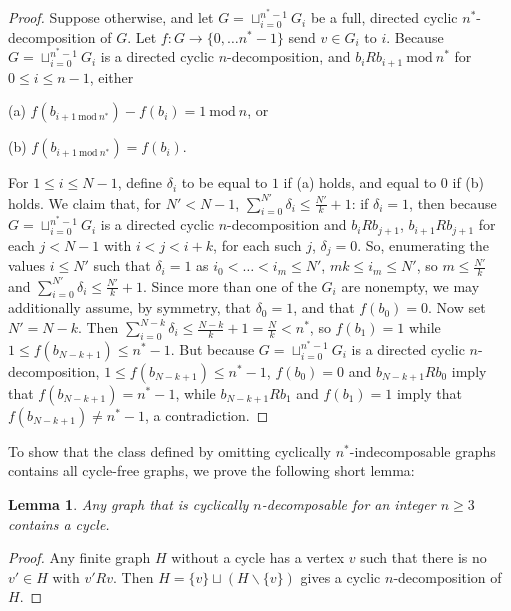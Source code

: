 \documentclass{amsart}
\newtheorem{lemma}[theorem]{Lemma}
\theoremstyle{definition}
\theoremstyle{remark}
\numberwithin{equation}{section}
\begin{document}
\begin{proof}
 Suppose otherwise, and let $G = \sqcup^{n^{*}-1}_{i = 0} G_{i}$ be a full, directed cyclic $n^{*}$-decomposition of $G$. Let $f: G \to \{0, \ldots n^{*}-1\}$ send $v \in G_{i}$ to $i$. Because $G = \sqcup^{n^{*}-1}_{i = 0} G_{i}$ is a directed cyclic $n$-decomposition, and $b_{i} R b_{i+1} \mathrm{\:mod\:} n^{*}$ for $0 \leq i \leq n-1$, either
 
 
 (a) $f(b_{i+1 \mathrm{\: mod \:} n^{*}})-f(b_{i})= 1 \mathrm{\: mod \:} n$, or

 (b) $f(b_{i+1 \mathrm{\: mod \:} n^{*}}) = f(b_{i})$.

For $1 \leq i \leq N-1$, define $\delta_{i}$ to be equal to $1$ if (a) holds, and equal to $0$ if (b) holds. We claim that, for $N' < N-1$, $\sum^{N'}_{i=0} \delta_{i} \leq \frac{N'}{k} +1$: if $\delta_{i} = 1$, then because $G = \sqcup^{n^{*}-1}_{i = 0} G_{i}$ is a directed cyclic $n$-decomposition and $b_{i}Rb_{j+1}$, $b_{i+1} R b_{j+1}$ for each $j < N-1$ with $i < j < i+k$, for each such $j$, $\delta_{j} = 0$. So, enumerating the values $i \leq N'$ such that $\delta_{i} = 1$ as $i_{0} < \ldots < i_{m} \leq N'$, $ mk \leq i_{m} \leq N'$, so $m \leq \frac{N'}{k}$ and $\sum^{N'}_{i=0} \delta_{i} \leq \frac{N'}{k} +1$. Since more than one of the $G_{i}$ are nonempty, we may additionally assume, by symmetry, that $\delta_{0} = 1$, and that $f(b_{0}) = 0$. Now set $N'= N-k$. Then $\sum^{N-k}_{i=0} \delta_{i} \leq \frac{N-k}{k} +1 = \frac{N}{k} < n^{*}$, so $f(b_{1}) = 1$ while $1 \leq f(b_{N-k+1}) \leq n^{*} -1$. But because $G = \sqcup^{n^{*}-1}_{i = 0} G_{i}$ is a directed cyclic $n$-decomposition, $1 \leq f(b_{N-k+1}) \leq n^{*} -1$, $f(b_{0}) = 0$ and $b_{N-k+1}Rb_{0}$ imply that $f(b_{N-k+1}) = n^{*} -1 $, while $b_{N-k+1}Rb_{1}$ and $f(b_{1}) = 1$ imply that $f(b_{N-k+1})\neq n^{*} -1 $, a contradiction.
 
 

\end{proof}


To show that the class defined by omitting cyclically $n^{*}$-indecomposable graphs contains all cycle-free graphs, we prove the following short lemma:

\begin{lemma}\label{cyclically n-indecomposable graphs have cycles}
    Any graph that is cyclically $n$-decomposable for an integer $n \geq 3$ contains a cycle.
\end{lemma}

\begin{proof}
    Any finite graph $H$ without a cycle has a vertex $v$ such that there is no $v' \in H$ with $v'Rv$. Then $H =\{v\} \sqcup (H \backslash \{v\})$ gives a cyclic $n$-decomposition of $H$.
\end{proof}
\end{document}

